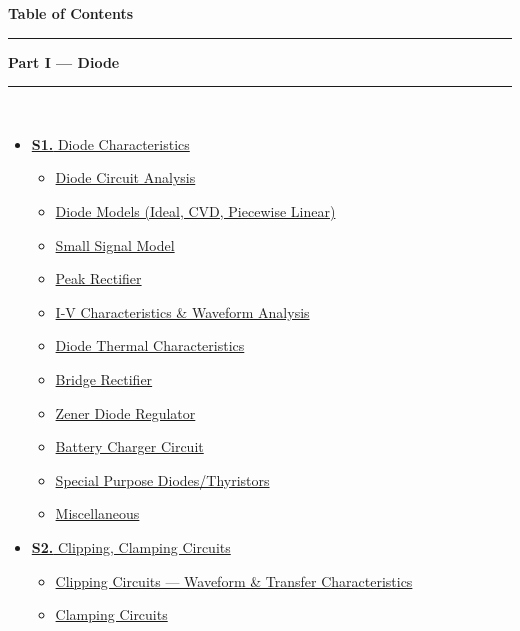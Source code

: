 \documentclass[12pt]{article}
\begin{document}
\thispagestyle{fancy}
\begin{center}
  {\LARGE\bfseries\textcolor{pblue}{Table of Contents}}\\[6pt]
  \textcolor{pblue}{\rule{0.6\textwidth}{0.8pt}}
\end{center}
\vspace{6pt}

\begin{tcolorbox}[breakable,colback=cA!5,colframe=cA,boxrule=1pt,arc=5pt,
  left=8pt,right=8pt,top=8pt,bottom=8pt,before skip=4pt]
  {\large\bfseries\textcolor{cA}{Part I --- Diode}}\\[5pt]
  \textcolor{cA!40}{\rule{\textwidth}{0.4pt}}\\[3pt]
  \small\begin{itemize}[leftmargin=1.2em,itemsep=1pt,label={\textcolor{cA}{$\triangleright$}}]
    \item \hyperref[sec:S1]{\textbf{S1.} Diode Characteristics}
      \begin{itemize}[leftmargin=1.5em,itemsep=0pt,label={\textcolor{cA}{$\cdot$}}]
        \item \hyperref[sub:s1-dc]{Diode Circuit Analysis}
        \item \hyperref[sub:s1-models]{Diode Models (Ideal, CVD, Piecewise Linear)}
        \item \hyperref[sub:s1-ssm]{Small Signal Model}
        \item \hyperref[sub:s1-peak]{Peak Rectifier}
        \item \hyperref[sub:s1-iv]{I-V Characteristics \& Waveform Analysis}
        \item \hyperref[sub:s1-thermal]{Diode Thermal Characteristics}
        \item \hyperref[sub:s1-rectifier]{Bridge Rectifier}
        \item \hyperref[sub:s1-zener]{Zener Diode Regulator}
        \item \hyperref[sub:s1-battery]{Battery Charger Circuit}
        \item \hyperref[sub:s1-spd]{Special Purpose Diodes/Thyristors}
        \item \hyperref[sub:s1-Miscellaneous]{Miscellaneous}
      \end{itemize}

      \item \hyperref[sec:S2]{\textbf{S2.} Clipping, Clamping Circuits}
      \begin{itemize}[leftmargin=1.5em,itemsep=0pt,label={\textcolor{cB}{$\cdot$}}]
        \item \hyperref[sub:s2-clipping]{Clipping Circuits --- Waveform \& Transfer Characteristics}
        \item \hyperref[sub:s2-clamping]{Clamping Circuits}
        
      \end{itemize}


  \end{itemize}
\end{tcolorbox}
\end{document}
